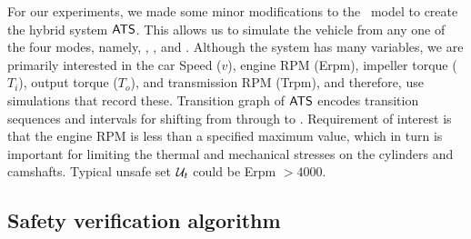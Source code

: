For our experiments, we made some minor modifications to  the \Simulink\ model to create the hybrid system  ${\operatorname{\mathsf{ATS}}}$. 
This allows us to simulate the vehicle from any one of the four modes, namely,  , ,  and .
%
Although the system has many variables, we are primarily  interested in the car Speed ($v$), engine RPM (Erpm), impeller torque ($T_i$), output torque ($T_o$), and transmission RPM (Trpm), and therefore, use simulations that record these. 
%
Transition graph of  ${\operatorname{\mathsf{ATS}}}$ encodes 
transition sequences and intervals for
shifting from  through to .
Requirement of interest is that the engine RPM is less than a specified maximum value, which in turn is important for limiting the thermal and mechanical stresses on the cylinders and camshafts. Typical unsafe set ${\mathcal U}_t$ could be  Erpm $>4000$.
%

%
%

\subsection{Safety verification algorithm}
\label{appendix:safetyveri}

